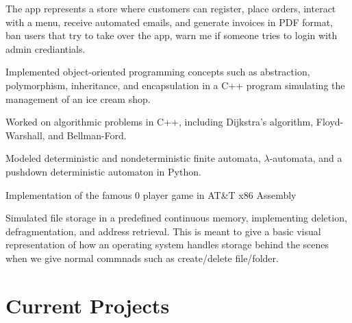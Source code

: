 \documentclass[letterpaper]{twentysecondcv} %
\begin{document}
\begin{twenty} %

    {The app represents a store where customers can register, place orders, interact with a menu, receive automated emails, and generate invoices in PDF format, ban users that try to take over the app, warn me if someone tries to login with admin crediantials.}

    {Implemented object-oriented programming concepts such as abstraction, polymorphism, inheritance, and encapsulation in a C++ program simulating the management of an ice cream shop.}

    {Worked on algorithmic problems in C++, including Dijkstra’s algorithm, Floyd-Warshall, and Bellman-Ford.}

    {Modeled deterministic and nondeterministic finite automata, $\lambda$-automata, and a pushdown deterministic automaton in Python.}

    {Implementation of the famous 0 player game in AT\&T x86 Assembly}

    {Simulated file storage in a predefined continuous memory, implementing deletion, defragmentation, and address retrieval. This is meant to give a basic visual representation of how an operating system handles storage behind the scenes when we give normal commnads such as create/delete file/folder.}

\end{twenty}



\section{Current Projects}
\end{document}
